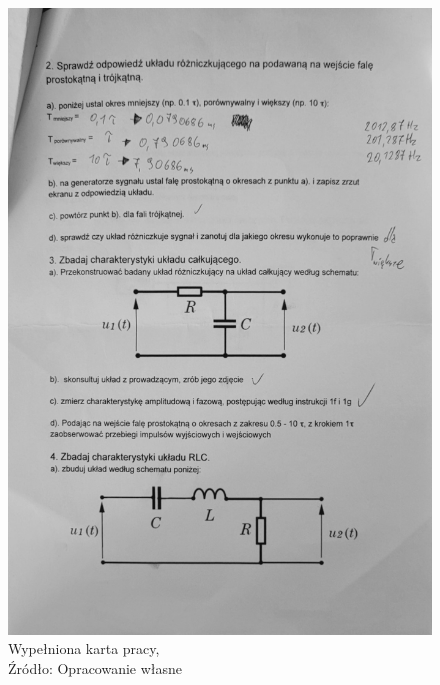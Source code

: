 \documentclass{article}
\begin{document}
\begin{figure}[!ht]
\begin{minipage}{.4\textwidth}
        \includegraphics[scale=0.15]{grafiki/notatki_2.jpg}
        \caption{Wypełniona karta pracy,
        \\Źródło: Opracowanie własne}
      \end{minipage}
    \end{figure}
\end{document}
